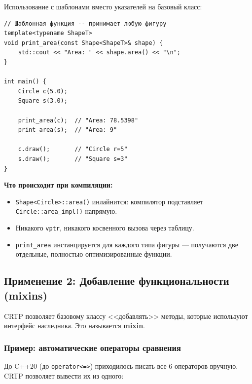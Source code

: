 \documentclass[a4paper,12pt]{article}
\begin{document}
Использование с шаблонами вместо указателей на базовый класс:

\begin{lstlisting}
// Шаблонная функция -- принимает любую фигуру
template<typename ShapeT>
void print_area(const Shape<ShapeT>& shape) {
    std::cout << "Area: " << shape.area() << "\n";
}

int main() {
    Circle c(5.0);
    Square s(3.0);

    print_area(c);  // "Area: 78.5398"
    print_area(s);  // "Area: 9"

    c.draw();       // "Circle r=5"
    s.draw();       // "Square s=3"
}
\end{lstlisting}

\textbf{Что происходит при компиляции:}
\begin{itemize}
    \item \texttt{Shape<Circle>::area()} инлайнится: компилятор подставляет
          \texttt{Circle::area\_impl()} напрямую.
    \item Никакого \texttt{vptr}, никакого косвенного вызова через таблицу.
    \item \texttt{print\_area} инстанцируется для каждого типа фигуры ---
          получаются две отдельные, полностью оптимизированные функции.
\end{itemize}

\subsection{Применение 2: Добавление функциональности (mixins)}

CRTP позволяет базовому классу <<добавлять>> методы, которые используют
интерфейс наследника. Это называется \textbf{mixin}.

\subsubsection{Пример: автоматические операторы сравнения}

До C++20 (до \texttt{operator<=>}) приходилось писать все 6 операторов вручную.
CRTP позволяет вывести их из одного:
\end{document}
